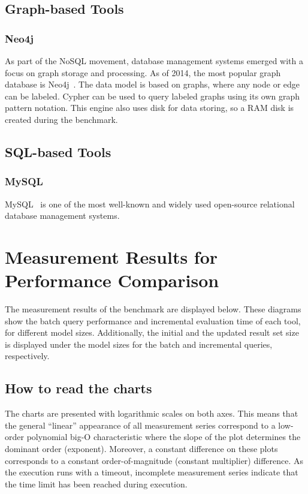 \subsection{Graph-based Tools}

\subsubsection{Neo4j}
As part of the NoSQL movement, database management systems emerged with a focus on graph storage and processing. As of 2014, the most popular graph database is 
Neo4j~\cite{neo4j}. The data model is based on graphs, where any node or edge can be labeled. Cypher can be used to query labeled graphs using its own graph pattern notation. This engine also uses disk for data storing, so a RAM disk is created during the benchmark.

\subsection{SQL-based Tools}

\subsubsection{MySQL}
MySQL~\cite{mysql} is one of the most well-known and widely used open-source relational database management systems.


\section{Measurement Results for Performance Comparison}
\label{sec:results}

The measurement results of the benchmark are displayed below. These diagrams show the batch query performance and incremental evaluation time of each tool, for different model sizes. Additionally, the initial and the updated result set size is displayed under the model sizes for the batch and incremental queries, respectively.

\subsection{How to read the charts}

The charts are presented with logarithmic scales on both axes. This means that the general ``linear'' appearance of all measurement series correspond to a low-order polynomial big-O characteristic where the slope of the plot determines the dominant order (exponent). Moreover, a constant difference on these plots corresponds to a constant order-of-magnitude (\ie constant multiplier) difference. As the execution runs with a timeout, incomplete measurement series indicate that the time limit has been reached during execution.
 
